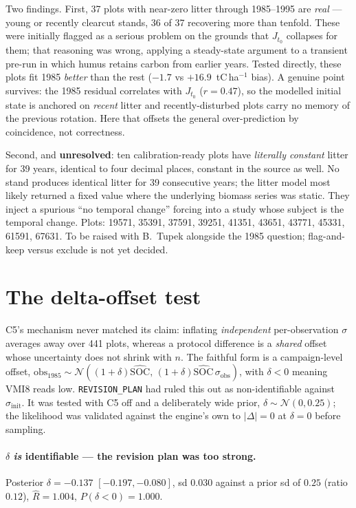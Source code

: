 \documentclass[11pt]{article}
\newcommand{\sinit}{\sigma_{\mathrm{init}}}
\newcommand{\sobs}{\sigma_{\mathrm{obs}}}
\begin{document}
Two findings. First, 37 plots with near-zero litter through 1985--1995 are \emph{real} ---
young or recently clearcut stands, 36 of 37 recovering more than tenfold. These were initially
flagged as a serious problem on the grounds that $J_{t_0}$ collapses for them; that reasoning
was wrong, applying a steady-state argument to a transient pre-run in which humus retains
carbon from earlier years. Tested directly, these plots fit 1985 \emph{better} than the rest
($-1.7$ vs $+16.9$~tC\,ha$^{-1}$ bias). A genuine point survives: the 1985 residual correlates
with $J_{t_0}$ ($r = 0.47$), so the modelled initial state is anchored on \emph{recent} litter
and recently-disturbed plots carry no memory of the previous rotation. Here that offsets the
general over-prediction by coincidence, not correctness.

Second, and \textbf{unresolved}: ten calibration-ready plots have \emph{literally constant}
litter for 39 years, identical to four decimal places, constant in the source as well. No stand
produces identical litter for 39 consecutive years; the litter model most likely returned a
fixed value where the underlying biomass series was static. They inject a spurious ``no temporal
change'' forcing into a study whose subject is the temporal change. Plots: 19571, 35391, 37591,
39251, 41351, 43651, 43771, 45331, 61591, 67631. To be raised with B.~Tupek alongside the 1985
question; flag-and-keep versus exclude is not yet decided.

\section{The delta-offset test}

C5's mechanism never matched its claim: inflating \emph{independent} per-observation
$\sigma$ averages away over 441 plots, whereas a protocol difference is a \emph{shared}
offset whose uncertainty does not shrink with $n$. The faithful form is a campaign-level
offset, $\mathrm{obs}_{1985}\sim\mathcal{N}\!\left((1+\delta)\widehat{\mathrm{SOC}},\,
(1+\delta)\widehat{\mathrm{SOC}}\,\sobs\right)$, with $\delta<0$ meaning VMI8 reads low.
\texttt{REVISION\_PLAN} had ruled this out as non-identifiable against $\sinit$. It was tested
with C5 off and a deliberately wide prior, $\delta \sim \mathcal{N}(0, 0.25)$; the likelihood
was validated against the engine's own to $|\Delta| = 0$ at $\delta = 0$ before sampling.

\paragraph{$\delta$ \emph{is} identifiable --- the revision plan was too strong.}
Posterior $\delta = -0.137$ $[-0.197, -0.080]$, sd $0.030$ against a prior sd of $0.25$
(ratio $0.12$), $\hat{R} = 1.004$, $P(\delta<0) = 1.000$.
\end{document}

